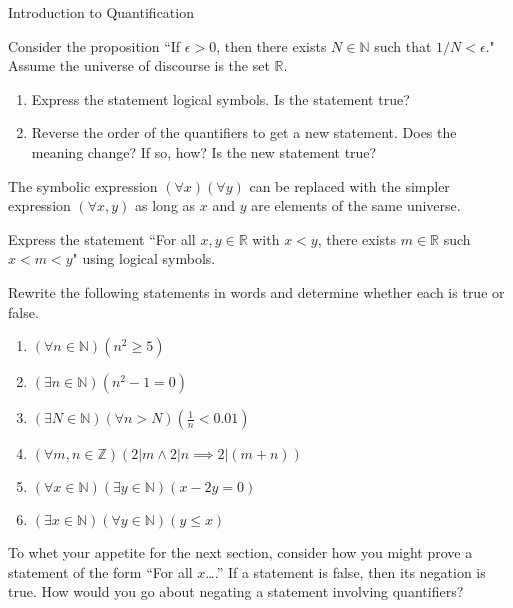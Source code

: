 \begin{section}{Introduction to Quantification}
\begin{exercise}
Consider the proposition ``If $\epsilon >0$, then there exists $N\in\mathbb{N}$ such that $1/N<\epsilon$."  Assume the universe of discourse is the set $\mathbb{R}$.
\begin{enumerate}[label=\textrm{(\alph*)}]
\item Express the statement logical symbols.   Is the statement true?
\item Reverse the order of the quantifiers to get a new statement. Does the meaning change?  If so, how?  Is the new statement true?
\end{enumerate}
\end{exercise}

The symbolic expression $(\forall x)(\forall y)$ can be replaced with the simpler expression $(\forall x,y)$ as long as $x$ and $y$ are elements of the same universe.

\begin{exercise}
Express the statement ``For all $x,y\in\mathbb{R}$ with $x<y$, there exists $m\in\mathbb{R}$ such $x<m<y$" using logical symbols.
\end{exercise}

\begin{exercise}
Rewrite the following statements in words and determine whether each is true or false.
\begin{enumerate}[label=\textrm{(\alph*)}]
\item $(\forall n \in \mathbb{N})(n^2 \geq 5)$
\item $(\exists n \in \mathbb{N})(n^2-1=0)$
\item $(\exists N \in \mathbb{N})(\forall  n > N)(\frac{1}{n} < 0.01)$
\item $(\forall m, n \in \mathbb{Z})(2|m \wedge 2|n \implies 2|(m+n))$
\item $(\forall x \in \mathbb{N})(\exists y \in \mathbb{N})(x-2y=0)$
\item $(\exists x \in \mathbb{N})(\forall y \in \mathbb{N})(y \leq x)$
\end{enumerate}
\end{exercise}

To whet your appetite for the next section, consider how you might prove a statement of the form ``For all $x$\ldots.'' If a statement is false, then its negation is true. How would you go about negating a statement involving quantifiers? 

\end{section}